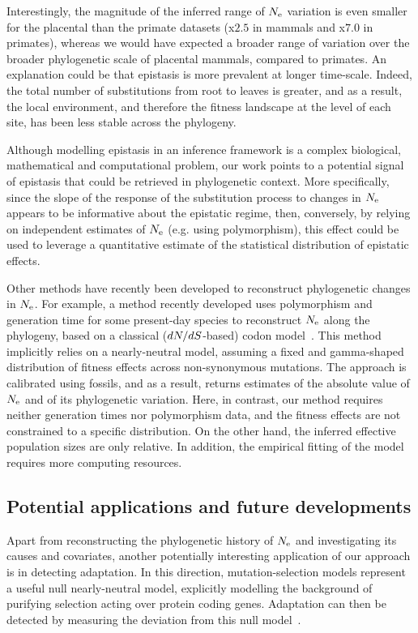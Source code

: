 Interestingly, the magnitude of the inferred range of $N_{\text{e}}$ variation is even smaller for the placental than the primate datasets (x$2.5$ in mammals and x$7.0$ in primates), whereas we would have expected a broader range of variation over the broader phylogenetic scale of placental mammals, compared to primates.
An explanation could be that epistasis is more prevalent at longer time-scale.
Indeed, the total number of substitutions from root to leaves is greater, and as a result, the local environment, and therefore the fitness landscape at the level of each site, has been less stable across the phylogeny.

Although modelling epistasis in an inference framework is a complex biological, mathematical and computational problem, our work points to a potential signal of epistasis that could be retrieved in phylogenetic context.
More specifically, since the slope of the response of the substitution process to changes in $N_{\text{e}}$ appears to be informative about the epistatic regime, then, conversely, by relying on independent estimates of $N_{\text{e}}$ (e.g. using polymorphism), this effect could be used to leverage a quantitative estimate of the statistical distribution of epistatic effects.

Other methods have recently been developed to reconstruct phylogenetic changes in $N_{\text{e}}$.
For example, a method recently developed uses polymorphism and generation time for some present-day species to reconstruct $N_{\text{e}}$ along the phylogeny, based on a classical ($dN/dS$-based) codon model~\citep{Brevet2019}.
This method implicitly relies on a nearly-neutral model, assuming a fixed and gamma-shaped distribution of fitness effects across non-synonymous mutations.
The approach is calibrated using fossils, and as a result, returns estimates of the absolute value of $N_{\text{e}}$ and of its phylogenetic variation.
Here, in contrast, our method requires neither generation times nor polymorphism data, and the fitness effects are not constrained to a specific distribution.
On the other hand, the inferred effective population sizes are only relative.
In addition, the empirical fitting of the model requires more computing resources.

\subsection{Potential applications and future developments}

Apart from reconstructing the phylogenetic history of $N_{\text{e}}$ and investigating its causes and covariates, another potentially interesting application of our approach is in detecting adaptation.
In this direction, mutation-selection models represent a useful null nearly-neutral model, explicitly modelling the background of purifying selection acting over protein coding genes.
Adaptation can then be detected by measuring the deviation from this null model~\citep{Rodrigue2016, Bloom2017}.

